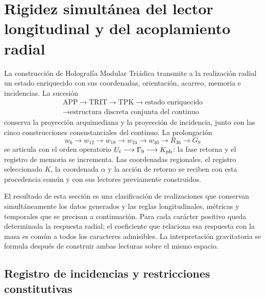 \section{Rigidez simultánea del lector longitudinal y del acoplamiento radial}
\label{g26:sec:rigidez-radial-es}

La construcción de Holografía Modular Triádica transmite a la realización
radial un estado enriquecido con sus coordenadas, orientación, acarreo,
memoria e incidencias. La sucesión
\[
 \begin{gathered}
 \mathrm{APP}\longrightarrow\mathrm{TRIT}\longrightarrow\mathrm{TPK}
 \longrightarrow\text{estado enriquecido}\\
 \longrightarrow\text{estructura discreta conjunta del continuo}
 \end{gathered}
\]
conserva la proyección arquimediana y la proyección de incidencia, junto con
las cinco construcciones consustanciales del continuo. La prolongación
\[
 w_6\longrightarrow w_{12}\longrightarrow w_{18}\longrightarrow
 w_{24}\longrightarrow w_{30}\longrightarrow R_{36}\longrightarrow G_9
\]
se articula con el orden operatorio
\(U_t\longrightarrow\Gamma_9\longrightarrow K_{\rm ph}\): la fase retorna
y el registro de memoria se incrementa. Las coordenadas regionales, el
registro seleccionado \(K\), la coordenada \(\alpha\) y la acción de retorno
se reciben con esta procedencia común y con sus lectores previamente
construidos.

El resultado de esta sección es una clasificación de realizaciones que
conservan simultáneamente los datos generados y las reglas longitudinales,
métricas y temporales que se precisan a continuación. Para cada carácter
positivo queda determinada la respuesta radial; el coeficiente que relaciona
esa respuesta con la masa es común a todos los caracteres admisibles.
La interpretación gravitatoria se formula después de construir ambas
lecturas sobre el mismo espacio.

\subsection{Registro de incidencias y restricciones constitutivas}

